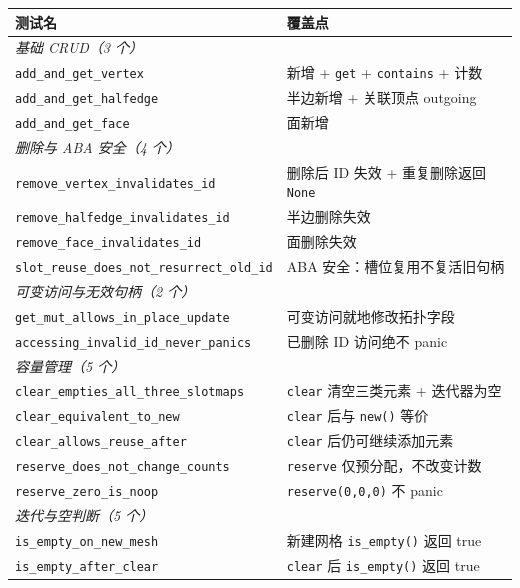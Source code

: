 \documentclass[11pt,a4paper]{article}
\begin{document}
\begin{center}
\renewcommand{\arraystretch}{1.18}
\begin{tabular}{@{}ll@{}}
  \toprule
  \textbf{测试名} & \textbf{覆盖点} \\
  \midrule
  \multicolumn{2}{l}{\textit{基础 CRUD（3 个）}} \\
  \texttt{add\_and\_get\_vertex}     & 新增 + \texttt{get} + \texttt{contains} + 计数 \\
  \texttt{add\_and\_get\_halfedge}   & 半边新增 + 关联顶点 outgoing \\
  \texttt{add\_and\_get\_face}       & 面新增 \\
  \midrule
  \multicolumn{2}{l}{\textit{删除与 ABA 安全（4 个）}} \\
  \texttt{remove\_vertex\_invalidates\_id}    & 删除后 ID 失效 + 重复删除返回 \texttt{None} \\
  \texttt{remove\_halfedge\_invalidates\_id}  & 半边删除失效 \\
  \texttt{remove\_face\_invalidates\_id}      & 面删除失效 \\
  \texttt{slot\_reuse\_does\_not\_resurrect\_old\_id} & ABA 安全：槽位复用不复活旧句柄 \\
  \midrule
  \multicolumn{2}{l}{\textit{可变访问与无效句柄（2 个）}} \\
  \texttt{get\_mut\_allows\_in\_place\_update} & 可变访问就地修改拓扑字段 \\
  \texttt{accessing\_invalid\_id\_never\_panics} & 已删除 ID 访问绝不 panic \\
  \midrule
  \multicolumn{2}{l}{\textit{容量管理（5 个）}} \\
  \texttt{clear\_empties\_all\_three\_slotmaps} & \texttt{clear} 清空三类元素 + 迭代器为空 \\
  \texttt{clear\_equivalent\_to\_new} & \texttt{clear} 后与 \texttt{new()} 等价 \\
  \texttt{clear\_allows\_reuse\_after} & \texttt{clear} 后仍可继续添加元素 \\
  \texttt{reserve\_does\_not\_change\_counts} & \texttt{reserve} 仅预分配，不改变计数 \\
  \texttt{reserve\_zero\_is\_noop}    & \texttt{reserve(0,0,0)} 不 panic \\
  \midrule
  \multicolumn{2}{l}{\textit{迭代与空判断（5 个）}} \\
  \texttt{is\_empty\_on\_new\_mesh}   & 新建网格 \texttt{is\_empty()} 返回 true \\
  \texttt{is\_empty\_after\_clear}    & \texttt{clear} 后 \texttt{is\_empty()} 返回 true \\

\end{tabular}
\end{center}
\end{document}
